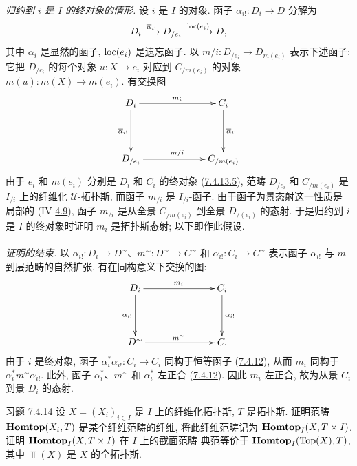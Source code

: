 \paragraph{}
\emph{归约到 $i$ 是 $I$ 的终对象的情形.}
设 $i$ 是 $I$ 的对象.
函子 $\alpha_{i!}:D_i\to D$ 分解为
$$
D_i \xrightarrow{\overline{\alpha}_{i!}} D_{/e_i} \xrightarrow{\operatorname{loc}(e_i)} D{},
$$
其中 $\bar{\alpha}_i$ 是显然的函子, $\operatorname{loc}(e_i)$ 是遗忘函子.
以 $m/i:D_{/e_i}\to D_{m(e_i)}$ 表示下述函子:
它把 $D_{/e_i}$ 的每个对象 $u:X\to e_i$
对应到 $C_{/m(e_i)}$ 的对象 $m(u):m(X)\to m(e_i)$.
有交换图
\[
\xymatrix@C=2.25cm@R=1.5cm{
D_i \ar[r]^{m_i} \ar[d]_{\bar{\alpha}_{i!}}& C_i\ar[d]^{\bar{\alpha}_{i!}}\\
D_{/e_i}  \ar[r]^{m/i} & C_{/m(e_i)}
}
\]
由于 $e_i$ 和 $m(e_i)$ 分别是 $D_i$ 和 $C_i$ 的终对象
(\hyperref[VI.par7.4.13.5]{7.4.13.5}),
范畴 $D_{/e_i}$ 和 $C_{/m(e_i)}$ 是 $I_{/i}$ 上的纤维化 $𝒰$-拓扑斯,
而函子 $m_{/i}$ 是 $I_{/i}$-函子.
由于函子为景态射这一性质是局部的
(IV \hyperref[IV.subsec4.9]{4.9}),
函子 $m_{/i}$ 是从全景 $C_{/m(e_i)}$ 到全景 $D_{/(e_i)}$ 的态射.
于是归约到 $i$ 是 $I$ 的终对象时证明 $m_i$ 是拓扑斯态射;
以下即作此假设.\pageoriginale

\paragraph{}
\emph{证明的结束.}
以 $\alpha_{i!}:D_i\to D^{\sim}$、$m^{\sim}:D^{\sim}\to C^{\sim}$
和 $\alpha_{i!}:C_i\to C^{\sim}$
表示函子 $\alpha_{i!}$ 与 $m$ 到层范畴的自然扩张.
有在同构意义下交换的图:
\[
\xymatrix@C=2.5cm@R=1.5cm{
D_i \ar[r]^{m_i} \ar[d]_{\alpha_{i!}}& C_i\ar[d]^{\alpha_{i!}}\\
D^{\sim}  \ar[r]^{m^{\sim}} & C .
}
\]
由于 $i$ 是终对象, 函子 $\alpha_i^{\ast}\alpha_{i!}:C_i\to C_i$
同构于恒等函子 (\hyperref[VI.lem7.4.12]{7.4.12}),
从而 $m_i$ 同构于 $\alpha_i^{\ast}m^{\sim}\alpha_{i!}$.
此外, 函子 $\alpha_i^{\ast}$、$m^{\sim}$ 和 $\alpha_i^{\ast}$ 左正合
(\hyperref[VI.lem7.4.12]{7.4.12}).
因此 $m_i$ 左正合, 故为从景 $C_i$ 到景 $D_i$ 的态射.

\begin{enonce*}[remark]{习题 7.4.14}
设 $X=(X_i)_{i\in I}$ 是 $I$ 上的纤维化拓扑斯, $T$ 是拓扑斯.
证明范畴 $\operatorname{\mathbf{Homtop}}(X_i,T)$ 是某个纤维范畴的纤维,
将此纤维范畴记为 $\operatorname{\mathbf{Homtop}}_I(X,T\times I)$.
证明 $\operatorname{\mathbf{Homtop}}_I(X,T\times I)$ 在 $I$ 上的截面范畴
典范等价于 $\operatorname{\mathbf{Homtop}}_I(\operatorname{Top}(X),T)$,
其中 $\Top(X)$ 是 $X$ 的全拓扑斯.
\end{enonce*}


